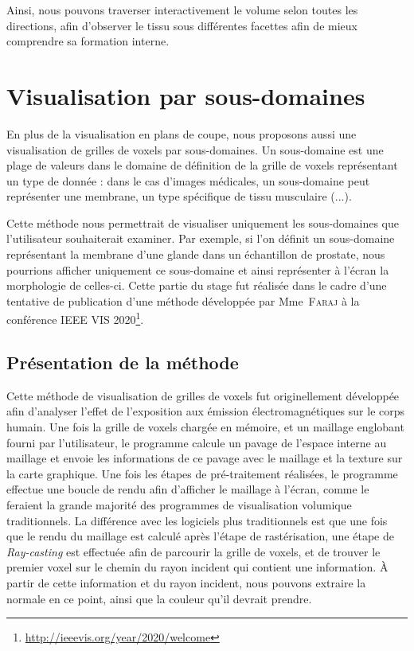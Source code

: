 {{		\par

		Ainsi, nous pouvons traverser interactivement le volume selon toutes les directions, afin d'observer le tissu sous différentes facettes afin de mieux comprendre sa formation interne.
	}

	\section{Visualisation par sous-domaines}
	{
		En plus de la visualisation en plans de coupe, nous proposons aussi une visualisation de grilles de voxels par sous-domaines. Un sous-domaine est une plage de valeurs dans le domaine de définition de la grille de voxels représentant un type de donnée : dans le cas d'images médicales, un sous-domaine peut représenter une membrane, un type spécifique de tissu musculaire (...).\par

		Cette méthode nous permettrait de visualiser uniquement les sous-domaines que l'utilisateur souhaiterait examiner. Par exemple, si l'on définit un sous-domaine représentant la membrane d'une glande dans un échantillon de prostate, nous pourrions afficher uniquement ce sous-domaine et ainsi représenter à l'écran la morphologie de celles-ci. Cette partie du stage fut réalisée dans le cadre d'une tentative de publication d'une méthode développée par Mme~\textsc{Faraj} à la conférence IEEE VIS 2020\footnote{\url{http://ieeevis.org/year/2020/welcome}}.\par

		\subsection{Présentation de la méthode}
		{
			Cette méthode de visualisation de grilles de voxels fut originellement développée afin d'analyser l'effet de l'exposition aux émission électromagnétiques sur le corps humain. Une fois la grille de voxels chargée en mémoire, et un maillage englobant fourni par l'utilisateur, le programme calcule un pavage de l'espace interne au maillage et envoie les informations de ce pavage avec le maillage et la texture sur la carte graphique. Une fois les étapes de pré-traitement réalisées, le programme effectue une boucle de rendu afin d'afficher le maillage à l'écran, comme le feraient la grande majorité des programmes de visualisation volumique traditionnels. La différence avec les logiciels plus traditionnels est que une fois que le rendu du maillage est calculé après l'étape de rastérisation, une étape de \textit{Ray-casting} est effectuée afin de parcourir la grille de voxels, et de trouver le premier voxel sur le chemin du rayon incident qui contient une information. À partir de cette information et du rayon incident, nous pouvons extraire la normale en ce point, ainsi que la couleur qu'il devrait prendre.\par

}}}
